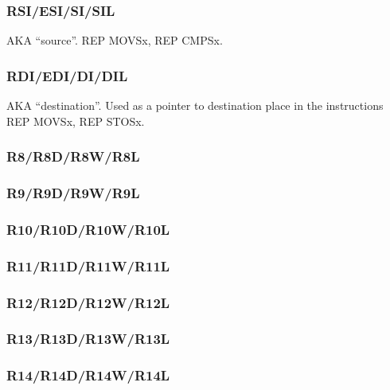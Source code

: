 \subsubsection{RSI/ESI/SI/SIL}

\ac{AKA} ``source''.  
REP MOVSx, REP CMPSx.

\subsubsection{RDI/EDI/DI/DIL}

\ac{AKA} ``destination''. 
{Used as a pointer to destination place in the instructions} REP MOVSx, REP STOSx.

\subsubsection{R8/R8D/R8W/R8L}

\subsubsection{R9/R9D/R9W/R9L}

\subsubsection{R10/R10D/R10W/R10L}

\subsubsection{R11/R11D/R11W/R11L}

\subsubsection{R12/R12D/R12W/R12L}

\subsubsection{R13/R13D/R13W/R13L}

\subsubsection{R14/R14D/R14W/R14L}


